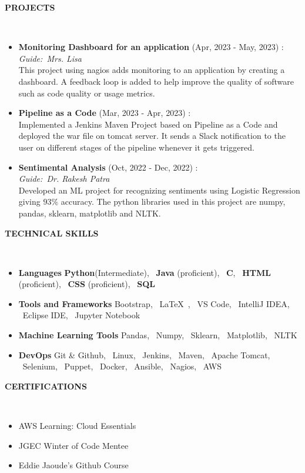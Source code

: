\documentclass[a4paper,10pt]{article}
\newcommand{\lsep}{-0.5cm}
\newcommand{\resheading}[1]{{\small \colorbox{mygrey}{\begin{minipage}{0.975\textwidth}{\textbf{#1 \vphantom{p\^{E}}}}\end{minipage}}}}
\begin{document}
\resheading{\textbf{PROJECTS} }\\[\lsep]
\begin{itemize}
\setlength\itemsep{0.5em}
\item \textbf{Monitoring Dashboard for an application} (Apr, 2023 - May, 2023) : \\
\textit{Guide:\ Mrs. Lisa}\\
This project using nagios adds monitoring to an application by creating a dashboard. A feedback loop is added to help improve the quality of software such as code quality or usage metrics.

\item \textbf{Pipeline as a Code} (Mar, 2023 - Apr, 2023) : \\
Implemented a Jenkins Maven Project based on Pipeline as a Code and deployed the war file on tomcat server. It sends a Slack notification to the user on different stages of the pipeline whenever it gets triggered.

\item \textbf{Sentimental Analysis} (Oct, 2022 - Dec, 2022) : \\
\textit{Guide:\ Dr. Rakesh Patra}\\
Developed an ML project for recognizing sentiments using Logistic Regression giving $93\%$ accuracy. The python libraries used in this project are numpy, pandas, sklearn, matplotlib and NLTK.
\end{itemize} 

\resheading{\textbf{TECHNICAL SKILLS} }\\[\lsep]
\begin{itemize}
\setlength\itemsep{0em}
\item \noindent \textbf{Languages} \textbf{Python}(Intermediate), \ \textbf{Java} (proficient), \ \textbf{C}, \ \textbf{HTML} (proficient), \ \textbf{CSS} (proficient), \ \textbf{SQL}
 \item \noindent\textbf{Tools and Frameworks} Bootstrap, \  \LaTeX\ , \ VS Code, \ IntelliJ IDEA, \ Eclipse IDE, \ Jupyter Notebook
\item \noindent \textbf{Machine Learning Tools} Pandas, \ Numpy, \ Sklearn, \ Matplotlib, \ NLTK
\item \noindent \textbf{DevOps} Git \& Github, \ Linux, \ Jenkins, \ Maven, \ Apache Tomcat, \ Selenium, \ Puppet, \ Docker, \ Ansible, \ Nagios, \ AWS
\end{itemize}

\resheading{\textbf{CERTIFICATIONS} }\\[\lsep]
\begin{itemize}
\setlength\itemsep{0em}
\item \noindent AWS Learning: Cloud Essentials
\item \noindent JGEC Winter of Code Mentee
\item \noindent Eddie Jaoude's Github Course

\end{itemize}
\end{document}
